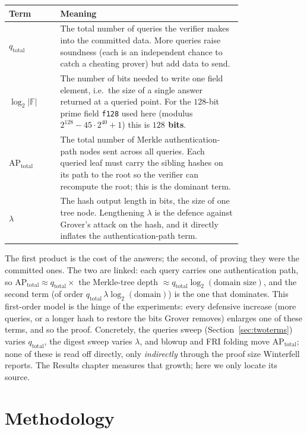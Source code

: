 \documentclass[11pt]{article}
\begin{document}
\begin{table}[htbp]\centering\footnotesize
\begin{tabular}{l p{0.78\linewidth}}
\toprule
Term & Meaning \\
\midrule
$q_{\mathrm{total}}$ & The total number of queries the verifier makes into the committed data. More
queries raise soundness (each is an independent chance to catch a cheating prover) but add data
to send. \\[2pt]
$\log_2|\mathbb{F}|$ & The number of bits needed to write one field element, i.e.\ the size of a single
answer returned at a queried point. For the $128$-bit prime field \texttt{f128} used here (modulus
$2^{128}-45\cdot2^{40}+1$) this is \textbf{$128$ bits}. \\[2pt]
$\mathrm{AP}_{\mathrm{total}}$ & The total number of Merkle authentication-path nodes sent across all
queries. Each queried leaf must carry the sibling hashes on its path to the root so the verifier can
recompute the root; this is the dominant term. \\[2pt]
$\lambda$ & The hash output length in bits, the size of one tree node. Lengthening $\lambda$ is the
defence against Grover's attack on the hash, and it directly inflates the authentication-path term. \\
\bottomrule
\end{tabular}
\end{table}

The first product is the cost of the answers; the second, of proving they were the committed ones. The two
are linked: each query carries one authentication path, so $\mathrm{AP}_{\mathrm{total}}\approx
q_{\mathrm{total}}\times$ the Merkle-tree depth $\approx q_{\mathrm{total}}\log_2(\text{domain size})$, and
the second term (of order $q_{\mathrm{total}}\,\lambda\log_2(\text{domain})$) is the one that
dominates. This first-order model is the hinge of the experiments: every defensive increase (more
queries, or a longer hash to restore the bits Grover removes) enlarges one of these terms, and so the
proof. Concretely, the queries sweep (Section~\ref{sec:twoterms}) varies $q_{\mathrm{total}}$, the digest
sweep varies $\lambda$, and blowup and FRI folding move $\mathrm{AP}_{\mathrm{total}}$; none of these is
read off directly, only \emph{indirectly} through the proof size Winterfell reports. The Results chapter
measures that growth; here we only locate its source.

\section{Methodology}
\label{sec:method}
\end{document}
